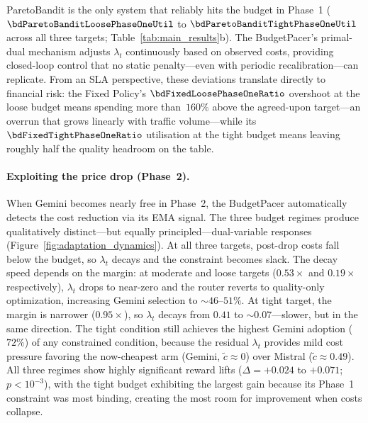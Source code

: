ParetoBandit is the only system that reliably hits the budget in Phase~1 ($\bdParetoBanditLoosePhaseOneUtil$ to $\bdParetoBanditTightPhaseOneUtil$ across all three targets; Table~\ref{tab:main_results}b). The BudgetPacer's primal-dual mechanism adjusts $\lambda_t$ continuously based on observed costs, providing closed-loop control that no static penalty---even with periodic recalibration---can replicate.
From an SLA perspective, these deviations translate directly to financial risk: the Fixed Policy's $\bdFixedLoosePhaseOneRatio$ overshoot at the loose budget means spending more than~$160\%$ above the agreed-upon target---an overrun that grows linearly with traffic volume---while its $\bdFixedTightPhaseOneRatio$ utilisation at the tight budget means leaving roughly half the quality headroom on the table.

\paragraph{Exploiting the price drop (Phase~2).}
When Gemini becomes nearly free in Phase~2, the BudgetPacer automatically detects the cost reduction via its EMA signal.
The three budget regimes produce qualitatively distinct---but equally principled---dual-variable responses (Figure~\ref{fig:adaptation_dynamics}).
At all three targets, post-drop costs fall below the budget, so $\lambda_t$ decays and the constraint becomes slack.
The decay speed depends on the margin: at moderate and loose targets ($0.53\times$ and $0.19\times$ respectively), $\lambda_t$ drops to near-zero and the router reverts to quality-only optimization, increasing Gemini selection to ${\sim}46$--$51\%$.
At tight target, the margin is narrower ($0.95\times$), so $\lambda_t$ decays from $0.41$ to ${\sim}0.07$---slower, but in the same direction.
The tight condition still achieves the highest Gemini adoption ($72\%$) of any constrained condition, because the residual $\lambda_t$ provides mild cost pressure favoring the now-cheapest arm (Gemini, $\tilde{c}{\approx}0$) over Mistral ($\tilde{c}{\approx}0.49$).
All three regimes show highly significant reward lifts ($\Delta{=}+0.024$ to $+0.071$; $p < 10^{-3}$), with the tight budget exhibiting the largest gain because its Phase~1 constraint was most binding, creating the most room for improvement when costs collapse.

